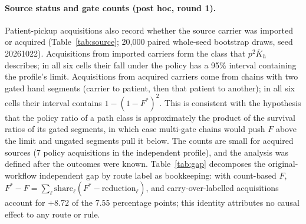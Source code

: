 \paragraph{Source status and gate counts (post hoc, round 1).} Patient-pickup
acquisitions also record whether the source carrier was imported or acquired
(Table~\ref{tab:source}; 20,000 paired whole-seed bootstrap draws, seed
20261022). Acquisitions from imported carriers form the class that
$p^2\overline K_h$ describes; in all six cells their fall under the policy has a
95\% interval containing the profile's limit. Acquisitions from acquired
carriers come from chains with two gated hand segments (carrier to patient, then
that patient to another); in all six cells their interval contains
$1-(1-F^*)^2$. This is consistent with the hypothesis that the policy ratio of a
path class is approximately the product of the survival ratios of its gated
segments, in which case multi-gate chains would push $F$ above the limit and
ungated segments pull it below. The counts are small for acquired sources (7 policy acquisitions
in the independent profile), and the analysis was defined after the outcomes
were known. Table~\ref{tab:gap} decomposes the original-workflow independent
gap by route label as bookkeeping: with count-based $F$, $F^*-F=\sum_\ell
\mathrm{share}_\ell(F^*-\mathrm{reduction}_\ell)$, and carry-over-labelled
acquisitions account for $+8.72$ of the 7.55 percentage points; this identity
attributes no causal effect to any route or rule.

